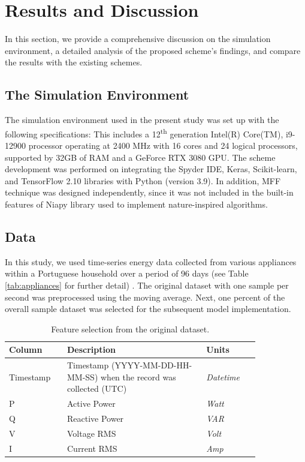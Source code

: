 \documentclass[journal]{IEEEtran}
\begin{document}
\section{Results and Discussion} \label{Results and Discussion}

In this section, we provide a comprehensive discussion on the simulation environment, a detailed analysis of the proposed scheme's findings, and compare the results with the existing schemes.

\subsection{The Simulation Environment}

The simulation environment used in the present study was set up with the following specifications: This includes a 12\textsuperscript{th} generation Intel(R) Core(TM), i9-12900 processor operating at 2400 MHz with 16 cores and 24 logical processors, supported by 32GB of RAM and a GeForce RTX 3080 GPU. The scheme development was performed on integrating the Spyder IDE, Keras, Scikit-learn, and TensorFlow 2.10 libraries with Python (version 3.9). In addition, MFF technique was designed independently, since it was not included in the built-in features of Niapy library used to implement nature-inspired algorithms.



\subsection{Data}

In this study, we used time-series energy data collected from various appliances within a Portuguese household over a period of 96 days (see Table \ref{tab:appliances} for further detail) \cite{Ref2}. The original dataset with one sample per second was preprocessed using the moving average. Next, one percent of the overall sample dataset was selected for the subsequent model implementation.






\begin{table}[htp]
\centering
\caption{Feature selection from the original dataset.}
\label{Features Selection of Time Series dataset}
\small
\begin{tabular}{|p{0.18\linewidth}|p{0.47\linewidth}|p{0.18\linewidth}|}
\hline
\rowcolor[HTML]{C0C0C0}
\textbf{Column} & \textbf{Description} & \textbf{Units} \\ \hline
Timestamp & Timestamp (YYYY-MM-DD-HH-MM-SS) when the record was collected (UTC) & \textit{Datetime}  \\
\hline
P & Active Power & \textit{Watt} \\
\hline
Q & Reactive Power & \textit{VAR}  \\
\hline
V & Voltage RMS & \textit{Volt}  \\
\hline
I & Current RMS & \textit{Amp} \\ \hline
\end{tabular}
\end{table}
\end{document}
